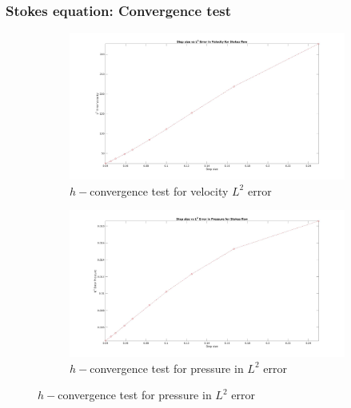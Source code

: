 \documentclass{beamer}
\begin{document}
\begin{frame}
\frametitle{Stokes equation: Convergence test}
\begin{figure}
\begin{subfigure}{0.4\textwidth}	
  \includegraphics[width=\linewidth]{l2_velocity_stokes.jpg}
  \caption{$h-$convergence test for velocity $L^2$ error}
  \label{fig:vel_stoke_conv}
\end{subfigure}
\begin{subfigure}{0.4\textwidth}	
  \includegraphics[width=\linewidth]{l2_pressure_stokes.jpg}
  \caption{$h-$convergence test for pressure in $L^2$ error}
  \label{fig:pre_stoke_conv}
\end{subfigure}
\caption{$h-$convergence test for pressure in $L^2$ error}
\end{figure}
\end{frame}
\end{document}
